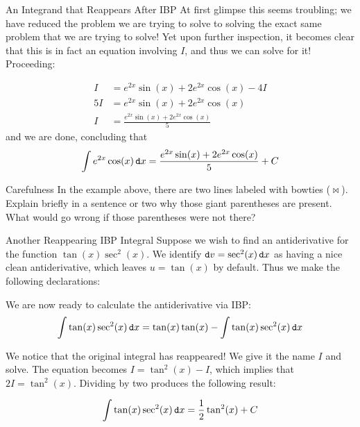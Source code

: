 \begin{example}{An Integrand that Reappears After IBP}
At first glimpse this seems troubling; we have reduced the problem we are trying to solve to solving the exact same problem that we are trying to solve!  Yet upon further inspection, it becomes clear that this is in fact an equation involving $I$, and thus we can solve for it!  Proceeding: 

\begin{align*} I&=e^{2x}\sin(x) +2e^{2x}\cos(x)-4I \\
5I&=e^{2x}\sin(x) +2e^{2x}\cos(x) \\
I&=\frac{e^{2x}\sin(x) +2e^{2x}\cos(x)}{5}
\end{align*} and we are done, concluding that $$ \int e^{2x}\cos(x) \mathop{}\!\mathtt{d} x=\frac{e^{2x}\sin(x) +2e^{2x}\cos(x)}{5}+C$$

\end{example}

\begin{exercise}{Carefulness \Coffeecup}
In the example above, there are two lines labeled with bowties ($\bowtie$).  Explain briefly in a sentence or two why those giant parentheses are present.  What would go wrong if those parentheses were not there?
\end{exercise}


\begin{example}{Another Reappearing IBP Integral}\label{AnotherReappearing}
 Suppose we wish to find an antiderivative for the function $\tan(x)\sec^2(x)$.  We identify $\mathop{}\!\mathtt{d} v=\sec^2(x) \mathop{}\!\mathtt{d} x$ as having a nice clean antiderivative, which leaves $u=\tan(x)$ by default.  Thus we make the following declarations:


We are now ready to calculate the antiderivative via IBP:
$$\int \tan(x)\sec^2(x) \mathop{}\!\mathtt{d} x = \tan(x)\tan(x) - \int \tan(x) \sec^2(x)\mathop{}\!\mathtt{d} x $$

We notice that the original integral has reappeared!  We give it the name $I$ and solve.  The equation becomes $I = \tan^2(x) - I$, which implies that $2I=\tan^2(x)$.  Dividing by two produces the following result:

$$\int \tan(x)\sec^2(x) \mathop{}\!\mathtt{d} x =\frac{1}{2}\tan^2(x)+C$$

\end{example}

